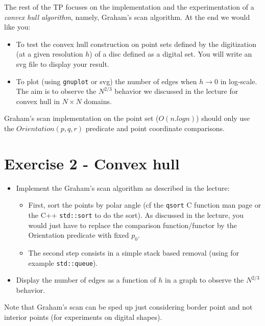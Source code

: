 \documentclass[a4paper, 11pt]{article}
\begin{document}
\bigskip
\bigskip
\bigskip

\par The rest of the TP focuses on the implementation and the experimentation of a \emph{convex hull algorithm}, namely, Graham's scan algorithm. At the end we would like you:
	\begin{itemize}
	\item To test the convex hull construction on point sets defined by the digitization (at a given resolution $h$) of a disc defined as a digital set. You will write an svg file to display your result.
	\item To plot (using \texttt{gnuplot} or svg) the number of edges when $h\rightarrow 0$ in log-scale. The aim is to observe the $N^{2/3}$ behavior we discussed in the lecture for convex hull in $N\times N$ domains.
	\end{itemize}


\par Graham's scan implementation on the point set ($O(n.logn)$) should only use the $Orientation(p,q,r)$ predicate and point coordinate comparisons.


\section*{Exercise 2 - \rm Convex hull}

\begin{itemize}
	\item Implement the Graham's scan algorithm as described in the lecture:
		\begin{itemize}
		\item First, sort the points by polar angle (cf the \texttt{qsort} C function man page  or the C++ \texttt{std::sort} to do the sort). As discussed in the lecture, you would just have to replace the comparison function/functor by the Orientation predicate with fixed $p_0$.
		\item The second step consists in a simple stack based removal (using for example \texttt{std::queue}).
		\end{itemize}
	\item Display the number of edges as a function of $h$ in a graph to observe the $N^{2/3}$ behavior.
\end{itemize}

\par Note that Graham's scan can be sped up just considering border point and not interior points (for experiments on digital shapes).
\end{document}
